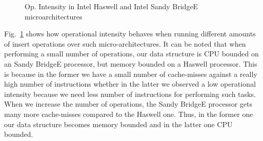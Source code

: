\begin{figure}[t]
	\centering
	
	\caption{Op. Intensity in Intel Haswell and Intel Sandy BridgeE microarchitectures}
	\label{fig:haswell_ivybridge}
\end{figure}

Fig.~\ref{fig:haswell_ivybridge} shows how operational intensity behaves when running different amounts of insert operations over such micro-architectures. It can be noted that when performing a small number of operations, our data structure is CPU bounded on an Sandy BridgeE processor, but memory bounded on a Haswell processor. This is because in the former we have a small number of cache-misses against a really high number of instructions whether in the latter we observed a low operational intensity because we need less number of instructions for performing such tasks. When we increase the number of operations, the Sandy BridgeE processor gets many more cache-misses compared to the Haswell one. Thus, in the former one our data structure becomes memory bounded and in the latter one CPU bounded.
